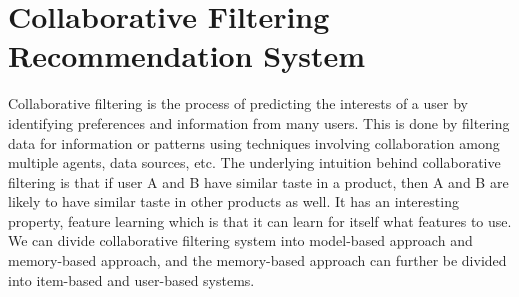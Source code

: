 \section{Collaborative Filtering Recommendation System}
Collaborative filtering is the process of predicting the interests of a user by identifying preferences and information from many users. 
This is done by filtering data for information or patterns using techniques involving collaboration among multiple agents, data sources, etc. 
The underlying intuition behind collaborative filtering is that if user A and B have similar taste in a product, then A and B are likely to have similar taste in other products as well.
It has an interesting property, feature learning which is that it can learn for itself what features to use. 
\\We can divide collaborative filtering system into model-based approach and memory-based approach, and the memory-based approach can 
further be divided into item-based and user-based systems.

